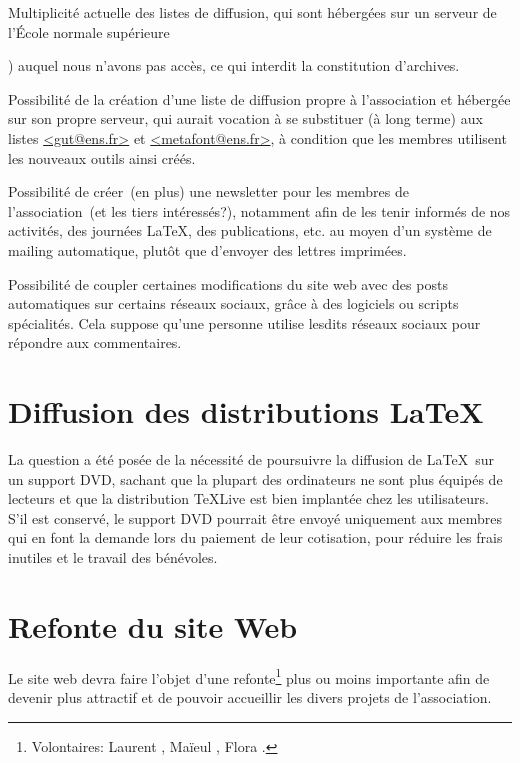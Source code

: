 \documentclass{tufte-handout}
\newcommand{\ratio}[3][]{\marginpar{\footnotesize{\textcolor{teal}{Temps requis: #2 / Utilité: #3}\par\noindent \textcolor{teal}{#1}}}}
\begin{document}
Multiplicité actuelle des listes de diffusion, qui sont hébergées sur un serveur de l'École normale supérieure~{) auquel nous n'avons pas accès, ce qui interdit la constitution d'archives.

Possibilité de la création\ratio[Simple, mais \emph{quid} de l'efficacité]{+}{+} d'une liste de diffusion propre à l'association et hébergée sur son propre serveur, qui aurait vocation à se substituer (à long terme) aux listes \url{<gut@ens.fr>} et \url{<metafont@ens.fr>}, à condition que les membres utilisent les nouveaux outils ainsi créés.

Possibilité de créer~(en plus) une newsletter\ratio[Simple et utile pour toucher davantage d'utilisateurs]{+}{++} pour les membres de l'association~(et les tiers intéressés?), notamment afin de les tenir informés de nos activités, des journées \LaTeX, des publications, etc. au moyen d'un système de mailing automatique, plutôt que d'envoyer des lettres imprimées.

Possibilité de coupler certaines modifications\ratio[Atteindre de nouveaux publics, mais ces médias correspondent-ils à notre philosophie?]{++}{+} du site web avec des posts automatiques sur certains réseaux sociaux, grâce à des logiciels ou scripts spécialités. Cela suppose qu'une personne utilise lesdits réseaux sociaux pour répondre aux commentaires.


\section{Diffusion des distributions \LaTeX}

La question a été posée\ratio[Relativement chronophage et coûteux]{++}{+} de la nécessité de poursuivre la diffusion de \LaTeX\ sur un support DVD, sachant que la plupart des ordinateurs ne sont plus équipés de lecteurs et que la distribution \TeX Live est bien implantée chez les utilisateurs. S'il est conservé, le support DVD pourrait être envoyé uniquement aux membres qui en font la demande lors du paiement de leur cotisation, pour réduire les frais inutiles et le travail des bénévoles.


\section{Refonte du site Web}

Le site web devra faire l'objet d'une refonte\ratio[Travail intense, mais limité dans le temps.]{+++}{+++}\footnote{Volontaires: Laurent , Maïeul , Flora .} plus ou moins importante afin de devenir plus attractif et de pouvoir accueillir les divers projets de l'association.

}
\end{document}
